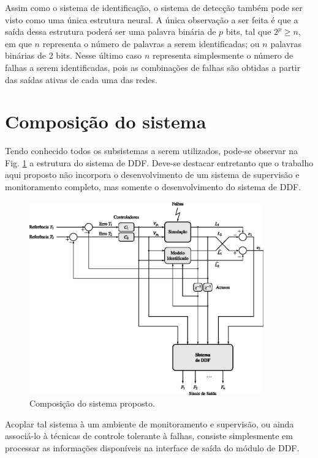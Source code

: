 Assim como o sistema de identificação, o sistema de detecção também pode ser
visto como uma única estrutura neural. A única observação a ser feita é que a
saída dessa estrutura poderá ser uma palavra binária de $p$ bits, tal que $2^p
\geq n$, em que $n$ representa o número de palavras a serem identificadas; ou
$n$ palavras binárias de 2 bits. Nesse último caso $n$ representa simplesmente o
número de falhas a serem identificadas, pois as combinações de falhas são
obtidas a partir das saídas ativas de cada uma das redes.

\section{Composição do sistema}
Tendo conhecido todos os subsistemas a serem utilizados, pode-se observar na
Fig. \ref{fig:composicao} a estrutura do sistema de DDF. Deve-se destacar
entretanto que o trabalho aqui proposto não incorpora o desenvolvimento de um
sistema de supervisão e monitoramento completo, mas somente o desenvolvimento do
sistema de DDF.

\begin{figure}[htb]
\centering
    \includegraphics[width=0.9\textwidth]{imgs/sistema/eps/composicao}
    \caption{Composição do sistema proposto.}
    \label{fig:composicao}
\end{figure}

Acoplar tal sistema à um ambiente de monitoramento e supervisão, ou ainda
associá-lo à técnicas de controle tolerante à falhas, consiste simplesmente em
processar as informações disponíveis na interface de saída do módulo de DDF.
